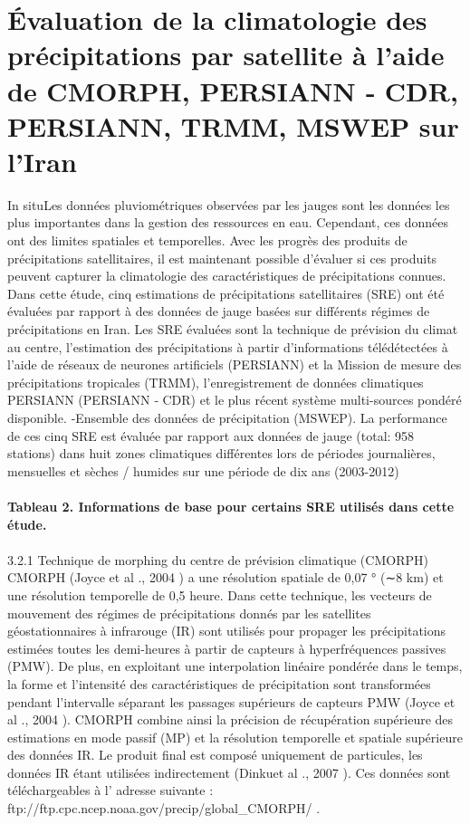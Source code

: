 \section{Évaluation de la climatologie des précipitations par satellite à l'aide de CMORPH, PERSIANN ‐ CDR, PERSIANN, TRMM, MSWEP sur l'Iran}
In situLes données pluviométriques observées par les jauges sont les données les plus importantes dans la gestion des ressources en eau. Cependant, ces données ont des limites spatiales et temporelles. Avec les progrès des produits de précipitations satellitaires, il est maintenant possible d'évaluer si ces produits peuvent capturer la climatologie des caractéristiques de précipitations connues. Dans cette étude, cinq estimations de précipitations satellitaires (SRE) ont été évaluées par rapport à des données de jauge basées sur différents régimes de précipitations en Iran. Les SRE évaluées sont la technique de prévision du climat au centre, l’estimation des précipitations à partir d’informations télédétectées à l’aide de réseaux de neurones artificiels (PERSIANN) et la Mission de mesure des précipitations tropicales (TRMM), l’enregistrement de données climatiques PERSIANN (PERSIANN ‐ CDR) et le plus récent système multi-sources pondéré disponible. ‐Ensemble des données de précipitation (MSWEP). La performance de ces cinq SRE est évaluée par rapport aux données de jauge (total: 958 stations) dans huit zones climatiques différentes lors de périodes journalières, mensuelles et sèches / humides sur une période de dix ans (2003-2012)\\ \ \\ 
\textbf{Tableau 2. Informations de base pour certains SRE utilisés dans cette étude.}\\ \ \\
3.2.1 Technique de morphing du centre de prévision climatique (CMORPH)
CMORPH (Joyce et al ., 2004 ) a une résolution spatiale de 0,07 ° (∼8 km) et une résolution temporelle de 0,5 heure. Dans cette technique, les vecteurs de mouvement des régimes de précipitations donnés par les satellites géostationnaires à infrarouge (IR) sont utilisés pour propager les précipitations estimées toutes les demi-heures à partir de capteurs à hyperfréquences passives (PMW). De plus, en exploitant une interpolation linéaire pondérée dans le temps, la forme et l’intensité des caractéristiques de précipitation sont transformées pendant l’intervalle séparant les passages supérieurs de capteurs PMW (Joyce et al ., 2004 ). CMORPH combine ainsi la précision de récupération supérieure des estimations en mode passif (MP) et la résolution temporelle et spatiale supérieure des données IR. Le produit final est composé uniquement de particules, les données IR étant utilisées indirectement (Dinkuet al ., 2007 ). Ces données sont téléchargeables à l’ adresse suivante : ftp://ftp.cpc.ncep.noaa.gov/precip/global_CMORPH/ .\\ \ \\
